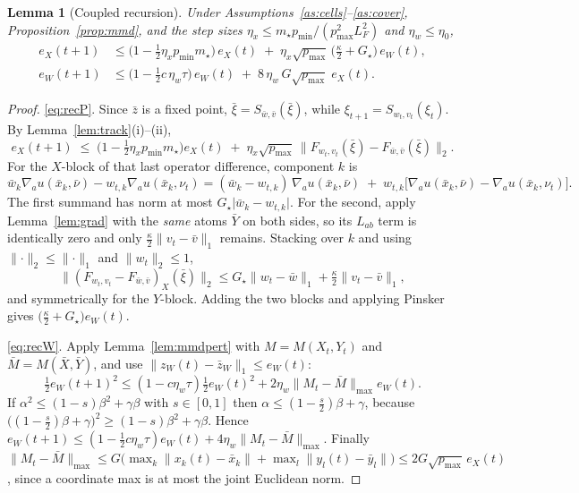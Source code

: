\documentclass[11pt,a4paper]{article}
\theoremstyle{plain}
\newtheorem{lemma}[theorem]{Lemma}
\theoremstyle{definition}
\theoremstyle{remark}
\newcommand{\norm}[1]{\lVert #1 \rVert}
\newcommand{\abs}[1]{\lvert #1 \rvert}
\begin{document}
\begin{lemma}[Coupled recursion]\label{lem:coupled}
Under Assumptions~\ref{as:cells}--\ref{as:cover}, Proposition~\ref{prop:mmd}, and the
step sizes $\eta_x\le m_\star p_{\min}/(p_{\max}^2L_F^2)$ and $\eta_w\le\eta_0$,
\begin{align}
e_X(t+1) &\le \Big(1-\tfrac12\eta_x p_{\min}m_\star\Big)\,e_X(t)
\;+\;\eta_x\sqrt{p_{\max}}\,\Big(\tfrac{\kappa}{2}+G_\star\Big)\,e_W(t), \label{eq:recP}\\[2pt]
e_W(t+1) &\le \Big(1-\tfrac12 c\,\eta_w\tau\Big)\,e_W(t)
\;+\;8\,\eta_w\,G\sqrt{p_{\max}}\;e_X(t). \label{eq:recW}
\end{align}
\end{lemma}
\begin{proof}
\eqref{eq:recP}. Since $\bar z$ is a fixed point, $\bar\xi=S_{\bar w,\bar v}(\bar\xi)$,
while $\xi_{t+1}=S_{w_t,v_t}(\xi_t)$. By Lemma~\ref{lem:track}(i)--(ii),
\[
e_X(t+1)\;\le\;\big(1-\tfrac12\eta_xp_{\min}m_\star\big)e_X(t)
\;+\;\eta_x\sqrt{p_{\max}}\,\norm{F_{w_t,v_t}(\bar\xi)-F_{\bar w,\bar v}(\bar\xi)}_2 .
\]
For the $X$-block of that last operator difference, component $k$ is
\[
\bar w_k\nabla_au(\bar x_k,\bar\nu)-w_{t,k}\nabla_au(\bar x_k,\nu_t)
=(\bar w_k-w_{t,k})\,\nabla_au(\bar x_k,\bar\nu)
\;+\;w_{t,k}\big[\nabla_au(\bar x_k,\bar\nu)-\nabla_au(\bar x_k,\nu_t)\big].
\]
The first summand has norm at most $G_\star\abs{\bar w_k-w_{t,k}}$. For the second,
apply Lemma~\ref{lem:grad} with the \emph{same} atoms $\bar Y$ on both sides, so its
$L_{ab}$ term is identically zero and only $\tfrac{\kappa}{2}\norm{v_t-\bar v}_1$
remains. Stacking over $k$ and using $\norm{\cdot}_2\le\norm{\cdot}_1$ and
$\norm{w_t}_2\le1$,
\[
\norm{(F_{w_t,v_t}-F_{\bar w,\bar v})_X(\bar\xi)}_2
\le G_\star\norm{w_t-\bar w}_1+\tfrac{\kappa}{2}\norm{v_t-\bar v}_1 ,
\]
and symmetrically for the $Y$-block. Adding the two blocks and applying Pinsker gives
$\big(\tfrac{\kappa}{2}+G_\star\big)e_W(t)$.

\eqref{eq:recW}. Apply Lemma~\ref{lem:mmdpert} with $M=M(X_t,Y_t)$ and
$\bar M=M(\bar X,\bar Y)$, and use $\norm{z_W(t)-\bar z_W}_1\le e_W(t)$:
\[
\tfrac12e_W(t+1)^2\le(1-c\eta_w\tau)\tfrac12e_W(t)^2+2\eta_w\norm{M_t-\bar M}_{\max}e_W(t).
\]
If $\alpha^2\le(1-s)\beta^2+\gamma\beta$ with $s\in[0,1]$ then
$\alpha\le(1-\tfrac{s}{2})\beta+\gamma$, because
$\big((1-\tfrac{s}{2})\beta+\gamma\big)^2\ge(1-s)\beta^2+\gamma\beta$. Hence
$e_W(t+1)\le(1-\tfrac12c\eta_w\tau)e_W(t)+4\eta_w\norm{M_t-\bar M}_{\max}$. Finally
$\norm{M_t-\bar M}_{\max}\le G\big(\max_k\norm{x_k(t)-\bar x_k}+\max_l\norm{y_l(t)-\bar y_l}\big)
\le2G\sqrt{p_{\max}}\,e_X(t)$, since a coordinate max is at most the joint Euclidean
norm.
\end{proof}
\end{document}
